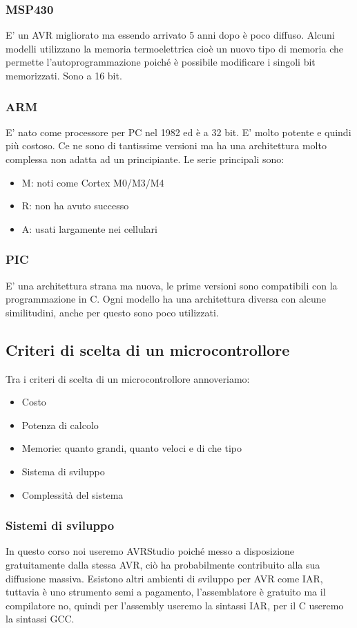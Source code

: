 \subsubsection{MSP430}
E' un AVR migliorato ma essendo arrivato 5 anni dopo è poco diffuso. Alcuni modelli utilizzano la memoria termoelettrica cioè un nuovo tipo di memoria che permette l'autoprogrammazione poiché è possibile modificare i singoli bit memorizzati. Sono a 16 bit.

\subsubsection{ARM}
E' nato come processore per PC nel 1982 ed è a 32 bit. E' molto potente e quindi più costoso. Ce ne sono di tantissime versioni ma ha una architettura molto complessa non adatta ad un principiante. Le serie principali sono:
\begin{itemize}
    \item M: noti come Cortex M0/M3/M4
    \item R: non ha avuto successo
    \item A: usati largamente nei cellulari
\end{itemize}

\subsubsection{PIC}
E' una architettura strana ma nuova, le prime versioni sono compatibili con la programmazione in C. Ogni modello ha una architettura diversa con alcune similitudini, anche per questo sono poco utilizzati.


\subsection{Criteri di scelta di un microcontrollore}
Tra i criteri di scelta di un microcontrollore annoveriamo:
\begin{itemize}
    \item Costo
    \item Potenza di calcolo
    \item Memorie: quanto grandi, quanto veloci e di che tipo
    \item Sistema di sviluppo
    \item Complessità del sistema
\end{itemize}

\subsubsection{Sistemi di sviluppo}
In questo corso noi useremo AVRStudio poiché messo a disposizione gratuitamente dalla stessa AVR, ciò ha probabilmente contribuito alla sua diffusione massiva.
Esistono altri ambienti di sviluppo per AVR come IAR, tuttavia è uno strumento semi a pagamento, l'assemblatore è gratuito ma il compilatore no, quindi per l'assembly useremo la sintassi IAR, per il C useremo la sintassi GCC.

